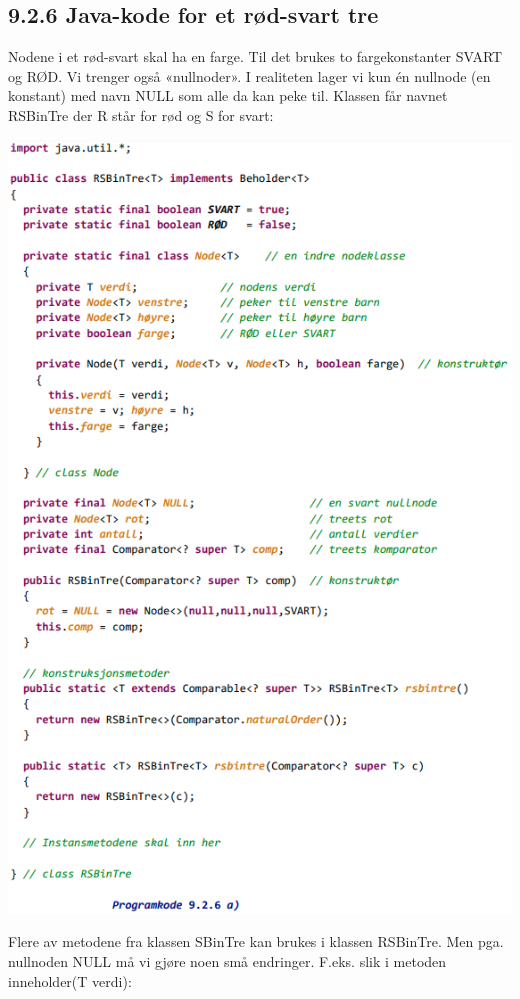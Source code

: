 \documentclass[11pt]{article}
\begin{document}
\newpage
    \subsection{9.2.6 Java-kode for et rød-svart tre}
        Nodene i et rød-svart skal ha en farge. Til det brukes to fargekonstanter SVART og RØD. Vi
        trenger også «nullnoder». I realiteten lager vi kun én nullnode (en konstant) med navn NULL
        som alle da kan peke til. Klassen får navnet RSBinTre der R står for rød og S for svart:

        \includegraphics[center]{pk-9.2.6a.png}

        Flere av metodene fra klassen SBinTre kan brukes i klassen RSBinTre. Men pga. nullnoden
        NULL må vi gjøre noen små endringer. F.eks. slik i metoden inneholder(T verdi):
\end{document}
